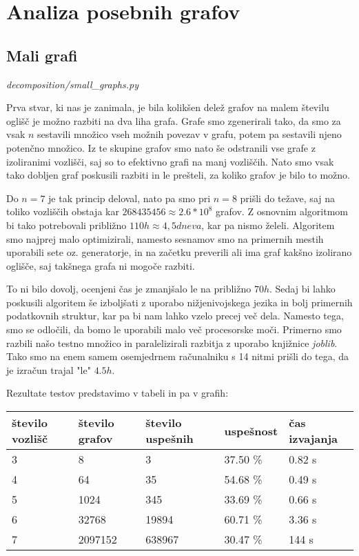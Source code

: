 \documentclass[12pt,a4paper]{amsart}
\theoremstyle{definition} %
\theoremstyle{plain} %
\begin{document}
\section{Analiza posebnih grafov}

\subsection{Mali grafi}
\emph{decomposition/small\_graphs.py}

Prva stvar, ki nas je zanimala, je bila kolikšen delež grafov na malem številu oglišč je možno razbiti na dva liha grafa.
Grafe smo zgenerirali tako, da smo za vsak $n$ sestavili množico vseh možnih povezav v grafu, potem pa sestavili njeno potenčno množico.
Iz te skupine grafov smo nato še odstranili vse grafe z izoliranimi vozlišči, saj so to efektivno grafi na manj vozliščih.
Nato smo vsak tako dobljen graf poskusili razbiti in le prešteli, za koliko grafov je bilo to možno.

Do $n=7$ je tak princip deloval, nato pa smo pri $n=8$ prišli do težave, saj na toliko vozliščih obstaja kar $268435456 \approx 2.6 * 10^8$ grafov.
Z osnovnim algoritmom bi tako potrebovali približno $110h \approx 4,5 dneva$, kar pa nismo želeli. Algoritem smo najprej malo optimizirali, namesto sesnamov smo
na primernih mestih uporabili sete oz. generatorje, in na začetku preverili ali ima graf kakšno izolirano oglišče, saj takšnega grafa ni mogoče razbiti.

To ni bilo dovolj, ocenjeni čas je zmanjšalo le na približno $70h$. Sedaj bi lahko poskusili algoritem še izboljšati z uporabo nižjenivojskega jezika in bolj
primernih podatkovnih struktur, kar pa bi nam lahko vzelo precej več dela. Namesto tega, smo se odločili, da bomo le uporabili malo več procesorske moči. Primerno
smo razbili našo testno množico in paralelizirali razbitja z uporabo knjižnice \emph{joblib}.
Tako smo na enem samem osemjedrnem računalniku s 14 nitmi prišli do tega, da je izračun trajal "le" $4.5h$.

\noindent Rezultate testov predstavimo v tabeli in pa v grafih:

\begin{adjustbox}{width={\textwidth},totalheight={\textheight},keepaspectratio}%
\begin{tabular}{|l|l|l|l|l|}
\hline
\textbf{število vozlišč} & \textbf{število grafov} & \textbf{število uspešnih} & \textbf{uspešnost} & \textbf{čas izvajanja} \\ \hline
3           & 8            & 3                & 37.50 \%     & 0.82 s         \\ \hline
4           & 64           & 35               & 54.68 \%     & 0.49 s         \\ \hline
5           & 1024         & 345              & 33.69 \%     & 0.66 s         \\ \hline
6           & 32768        & 19894            & 60.71 \%     & 3.36 s         \\ \hline
7           & 2097152      & 638967           & 30.47 \%    & 144 s          \\ \hline
\end{tabular}
\end{adjustbox}
\end{document}
